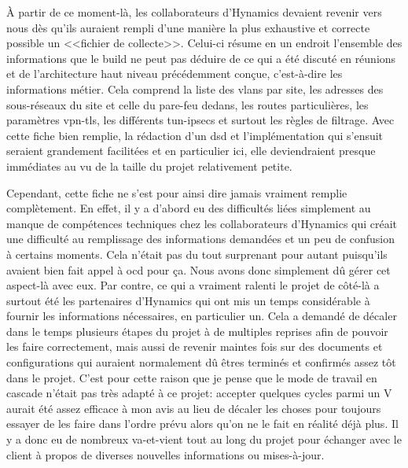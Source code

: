 \documentclass[12pt, oneside, a4paper, titlepage]{report}
\begin{document}
À partir de ce moment-là, les collaborateurs d'Hynamics devaient revenir vers
nous dès qu'ils auraient rempli d'une manière la plus exhaustive et correcte
possible un <<fichier de collecte>>. Celui-ci résume en un endroit l'ensemble
des informations que le \gls{build} ne peut pas déduire de ce qui a été discuté
en réunions et de l'architecture haut niveau précédemment conçue, c'est-à-dire
les informations métier. Cela comprend la liste des \glspl{vlan} par site, les
adresses des sous-réseaux du site et celle du pare-feu dedans, les routes
particulières, les paramètres \gls{vpn-tls}, les différents \glspl{tun-ipsec} et
surtout les règles de filtrage. Avec cette fiche bien remplie, la rédaction d'un
\gls{dsd} et l'implémentation qui s'ensuit seraient grandement facilitées et en
particulier ici, elle deviendraient presque immédiates au vu de la taille du
projet relativement petite.

Cependant, cette fiche ne s'est pour ainsi dire jamais vraiment remplie
complètement. En effet, il y a d'abord eu des difficultés liées simplement au
manque de compétences techniques chez les collaborateurs d'Hynamics qui créait
une difficulté au remplissage des informations demandées et un peu de confusion
à certains moments. Cela n'était pas du tout surprenant pour autant puisqu'ils
avaient bien fait appel à \gls{ocd} pour ça. Nous avons donc simplement dû gérer
cet aspect-là avec eux. Par contre, ce qui a vraiment ralenti le projet de
côté-là a surtout été les partenaires d'Hynamics qui ont mis un temps
considérable à fournir les informations nécessaires, en particulier un. Cela a
demandé de décaler dans le temps plusieurs étapes du projet à de multiples
reprises afin de pouvoir les faire correctement, mais aussi de revenir maintes
fois sur des documents et configurations qui auraient normalement dû êtres
terminés et confirmés assez tôt dans le projet. C'est pour cette raison que je
pense que le mode de travail en cascade n'était pas très adapté à ce projet:
accepter quelques cycles parmi un V aurait été assez efficace à mon avis au lieu
de décaler les choses pour toujours essayer de les faire dans l'ordre prévu
alors qu'on ne le fait en réalité déjà plus. Il y a donc eu de nombreux
va-et-vient tout au long du projet pour échanger avec le client à propos de
diverses nouvelles informations ou mises-à-jour.
\end{document}
